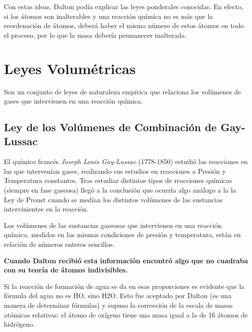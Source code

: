 Con estas ideas, Dalton podía explicar las leyes ponderales conocidas. En efecto, si los átomos son inalterables y una reacción química no es más que la reordenación de átomos, deberá haber el mismo número de estos átomos en todo el proceso, por lo que la masa debería permanecer inalterada.

\section{Leyes Volumétricas}

Son un conjunto de leyes de naturaleza empírica que relaciona los volúmenes de gases que intervienen en una reacción química.

\subsection{Ley de los Volúmenes de Combinación de Gay-Lussac}

El químico francés \emph{Joseph Louis Gay-Lussac} (1778-1850) estudió las reacciones en las que intervenían gases, realizando sus estudios en reacciones a Presión y Temperatura constantes. Tras estudiar distintos tipos de reacciones químicas (siempre en fase gaseosa) llegó a la conclusión que ocurría algo análogo a la la Ley de Proust cuando se medían los distintos volúmenes de las sustancias intervinientes en la reacción.\\



\begin{law}
	Los volúmenes de las sustancias gaseosas que intervienen en una reacción química, medidos en las mismas condiciones de presión y temperatura, están en relación de números enteros sencillos.
\end{law}

\begin{center}
	\textbf{Cuando Dalton recibió esta información encontró algo que no cuadraba con su teoría de átomos indivisibles.}\\
\end{center}

Si la reacción de formación de agua se da en esas proporciones es evidente que la fórmula del agua no es HO, sino H2O. Esto fue aceptado por Dalton (es una manera de determinar fórmulas) y supuso la corrección de la escala de masas atómicas relativas: el átomo de oxígeno tiene una masa igual a la de 16 átomos de hidrógeno.\\

